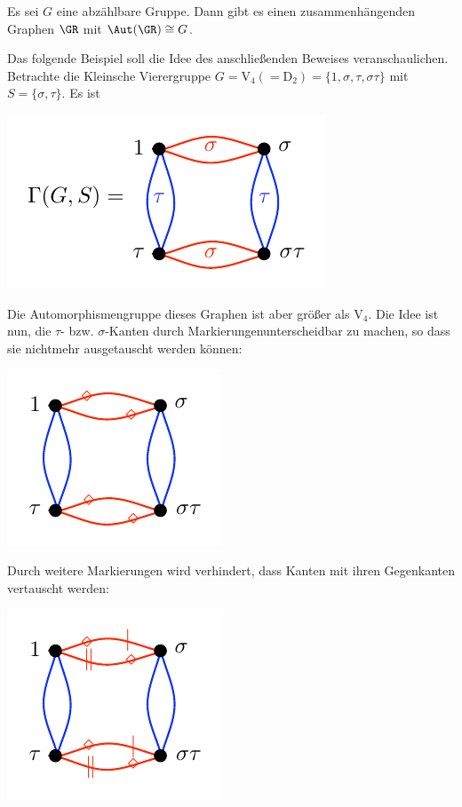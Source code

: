 \SATZ\label{satz_abzb} Es sei $G$ eine abzählbare Gruppe. Dann gibt es einen
zusammenhängenden Graphen $\GR$ mit $\Aut(\GR)\cong G$.

Das folgende Beispiel soll die Idee des anschließenden Beweises
veranschaulichen.
\BSP Betrachte die Kleinsche Vierergruppe
$G=\mathrm{V}_4(=\mathrm{D}_2)=\{1,\sigma,\tau,\sigma\tau\}$
mit $S=\{\sigma,\tau\}$.
Es ist
\begin{center}
	\includegraphics{grugraImages/klein41}
\end{center}
Die Automorphismengruppe dieses Graphen ist aber größer als
$\mathrm{V}_4$. Die Idee ist nun, die $\tau$- bzw. $\sigma$-Kanten
durch \glqq Markierungen\grqq unterscheidbar zu machen,
so dass sie nichtmehr ausgetauscht werden können:
\begin{center}
	\includegraphics{grugraImages/klein42}
\end{center}
Durch weitere Markierungen wird verhindert, dass Kanten mit ihren
Gegenkanten vertauscht werden:
\begin{center}
	\includegraphics{grugraImages/klein43}
\end{center}

